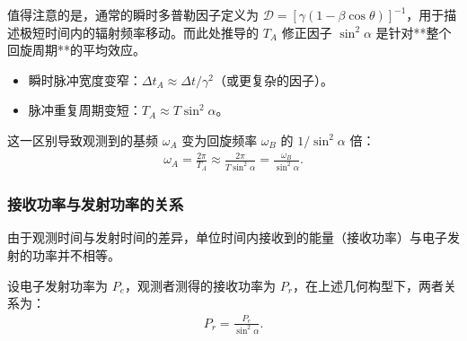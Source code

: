 \begin{derivationnote}[频率与多普勒因子的区别]
值得注意的是，通常的瞬时多普勒因子定义为 $\mathcal{D} = [\gamma(1 - \beta \cos\theta)]^{-1}$，用于描述极短时间内的辐射频率移动。而此处推导的 $T_A$ 修正因子 $\sin^2\alpha$ 是针对**整个回旋周期**的平均效应。
\begin{itemize}
    \item 瞬时脉冲宽度变窄：$\Delta t_{A} \approx \Delta t / \gamma^2$（或更复杂的因子）。
    \item 脉冲重复周期变短：$T_{A} \approx T \sin^2\alpha$。
\end{itemize}
这一区别导致观测到的基频 $\omega_{A}$ 变为回旋频率 $\omega_{B}$ 的 $1/\sin^2\alpha$ 倍：
\begin{align}
    \omega_{A} = \frac{2\pi}{T_{A}} \approx \frac{2\pi}{T \sin^2\alpha} = \frac{\omega_{B}}{\sin^2\alpha}.
\end{align}
\end{derivationnote}

\subsubsection{接收功率与发射功率的关系}

由于观测时间与发射时间的差异，单位时间内接收到的能量（接收功率）与电子发射的功率并不相等。

\begin{theorem}[功率变换关系]
\label{thm:power_relation}
设电子发射功率为 $P_{e}$，观测者测得的接收功率为 $P_{r}$，在上述几何构型下，两者关系为：
\begin{align}
    P_{r} = \frac{P_{e}}{\sin^2\alpha}.
    \label{eq:power_relation}
\end{align}
\end{theorem}

